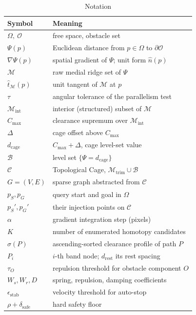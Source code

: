 \documentclass[conference]{IEEEtran}
\begin{document}
\begin{table}[htbp]
\caption{Notation}
\label{tab:notation}
\begin{center}
\renewcommand{\arraystretch}{1.12}
\begin{tabular}{@{}ll@{}}
\toprule
\textbf{Symbol} & \textbf{Meaning} \\ \midrule
$\Omega,\ \mathcal{O}$ & free space, obstacle set \\
$\Psi(p)$ & Euclidean distance from $p\in\Omega$ to $\partial\mathcal{O}$ \\
$\nabla\Psi(p)$ & spatial gradient of $\Psi$; unit form $\hat{n}(p)$ \\
$\mathcal{M}$ & raw medial ridge set of $\Psi$ \\
$\hat{t}_{\mathcal{M}}(p)$ & unit tangent of $\mathcal{M}$ at $p$ \\
$\tau$ & angular tolerance of the parallelism test \\
$\mathcal{M}_{\mathrm{int}}$ & interior (structured) subset of $\mathcal{M}$ \\
$C_{\max}$ & clearance supremum over $\mathcal{M}_{\mathrm{int}}$ \\
$\Delta$ & cage offset above $C_{\max}$ \\
$d_{\mathrm{cage}}$ & $C_{\max}+\Delta$, cage level-set value \\
$\mathcal{B}$ & level set $\{\Psi = d_{\mathrm{cage}}\}$ \\
$\mathcal{C}$ & Topological Cage, $\mathcal{M}_{\mathrm{trim}}\cup\mathcal{B}$ \\
$G=(V,E)$ & sparse graph abstracted from $\mathcal{C}$ \\
$p_S,p_G$ & query start and goal in $\Omega$ \\
$p_S',p_G'$ & their injection points on $\mathcal{C}$ \\
$\alpha$ & gradient integration step (pixels) \\
$K$ & number of enumerated homotopy candidates \\
$\sigma(P)$ & ascending-sorted clearance profile of path $P$ \\
$P_i$ & $i$-th band node; $d_{\mathrm{rest}}$ its rest spacing \\
$\tau_O$ & repulsion threshold for obstacle component $O$ \\
$W_s,W_r,D$ & spring, repulsion, damping coefficients \\
$\epsilon_{\mathrm{stab}}$ & velocity threshold for auto-stop \\
$\rho+\delta_{\mathrm{safe}}$ & hard safety floor \\ \bottomrule
\end{tabular}
\end{center}
\end{table}
\end{document}
